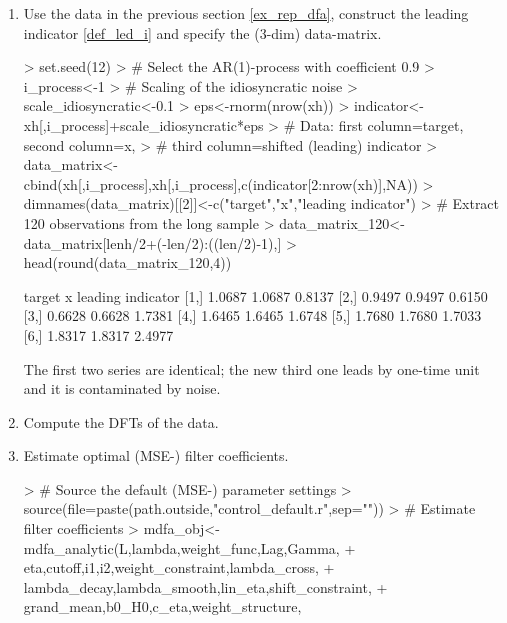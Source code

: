 \documentclass[a4paper]{book}
\begin{document}
\begin{enumerate}
\item Use the data in the previous section \ref{ex_rep_dfa}, construct the leading indicator \ref{def_led_i} and specify the (3-dim) data-matrix.
\begin{Schunk}
\begin{Sinput}
> set.seed(12)
> # Select the AR(1)-process with coefficient 0.9
> i_process<-1
> # Scaling of the idiosyncratic noise
> scale_idiosyncratic<-0.1
> eps<-rnorm(nrow(xh))
> indicator<-xh[,i_process]+scale_idiosyncratic*eps
> # Data: first column=target, second column=x, 
> #   third column=shifted (leading) indicator
> data_matrix<-cbind(xh[,i_process],xh[,i_process],c(indicator[2:nrow(xh)],NA))
> dimnames(data_matrix)[[2]]<-c("target","x","leading indicator")
> # Extract 120 observations from the long sample
> data_matrix_120<-data_matrix[lenh/2+(-len/2):((len/2)-1),]
> head(round(data_matrix_120,4))
\end{Sinput}
\begin{Soutput}
     target      x leading indicator
[1,] 1.0687 1.0687            0.8137
[2,] 0.9497 0.9497            0.6150
[3,] 0.6628 0.6628            1.7381
[4,] 1.6465 1.6465            1.6748
[5,] 1.7680 1.7680            1.7033
[6,] 1.8317 1.8317            2.4977
\end{Soutput}
\end{Schunk}
The first two series are identical; the new third one leads by one-time unit and it is contaminated by noise.
\item Compute the DFTs of the data.
\begin{Schunk}
\end{Schunk}
\item Estimate optimal (MSE-) filter coefficients.
\begin{Schunk}
\begin{Sinput}
> # Source the default (MSE-) parameter settings
> source(file=paste(path.outside,"control_default.r",sep=""))
> # Estimate filter coefficients
> mdfa_obj<-mdfa_analytic(L,lambda,weight_func,Lag,Gamma,
+                     eta,cutoff,i1,i2,weight_constraint,lambda_cross,
+                     lambda_decay,lambda_smooth,lin_eta,shift_constraint,
+                     grand_mean,b0_H0,c_eta,weight_structure,

\end{Sinput}
\end{Schunk}
\end{enumerate}
\end{document}
